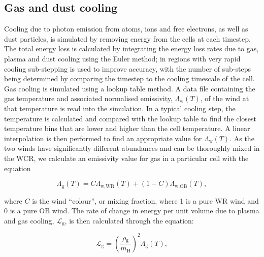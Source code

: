 \documentclass[fleqn,usenatbib]{mnras}
\newcommand{\rms}[1]{\ensuremath{_{\text{#1}}}}
\begin{document}

\subsection{Gas and dust cooling}
\label{sec:gas-dust-cooling}

Cooling due to photon emission from atoms, ions and free electrons, as well as dust particles, is simulated by removing energy from the cells at each timestep.
The total energy loss is calculated by integrating the energy loss rates due to gas, plasma and dust cooling using the Euler method; in regions with very rapid cooling sub-stepping is used to improve accuracy, with the number of sub-steps being determined by comparing the timestep to the cooling timescale of the cell.
Gas cooling is simulated using a lookup table method.
A data file containing the gas temperature and associated normalised emissivity, $\Lambda\rms{w}(T)$, of the wind at that temperature is read into the simulation.
In a typical cooling step, the temperature is calculated and compared with the lookup table to find the closest temperature bins that are lower and higher than the cell temperature.
A linear interpolation is then performed to find an appropriate value for $\Lambda\rms{w} (T)$.
As the two winds have significantly different abundances and can be thoroughly mixed in the WCR, we calculate an emissivity value for gas in a particular cell with the equation

\begin{equation}
  \Lambda\rms{g}(T) = C\Lambda\rms{w,WR}(T) + (1-C)\Lambda\rms{w,OB}(T) , 
\end{equation}

\noindent
where $C$ is the wind ``colour'', or mixing fraction, where 1 is a pure WR wind and 0 is a pure OB wind.
The rate of change in energy per unit volume due to plasma and gas cooling, $\mathcal{L}\rms{g}$, is then calculated through the equation:

\begin{equation}
  \mathcal{L}\rms{g} = \left(\frac{\rho\rms{g}}{m\rms{H}}\right)^2 \Lambda\rms{g}(T),
\end{equation}
\end{document}
